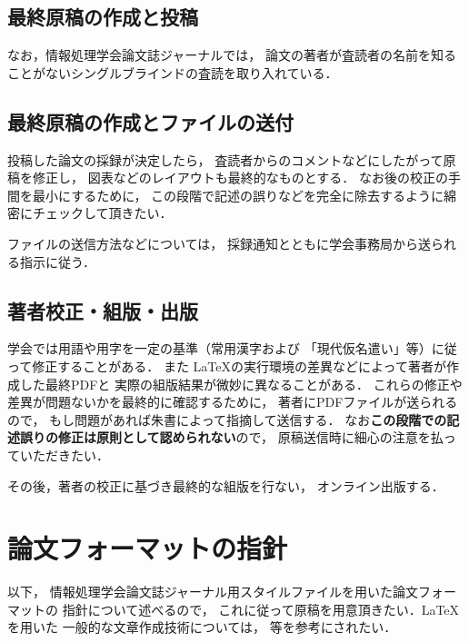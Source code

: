 \documentclass[submit]{ipsj}
\begin{document}
\subsection{最終原稿の作成と投稿}


なお，情報処理学会論文誌ジャーナルでは，
論文の著者が査読者の名前を知ることがないシングルブラインドの査読を取り入れている．




\subsection{最終原稿の作成とファイルの送付}

投稿した論文の採録が決定したら，
査読者からのコメントなどにしたがって原稿を修正し，
図表などのレイアウトも最終的なものとする．
なお後の校正の手間を最小にするために，
この段階で記述の誤りなどを完全に除去するように綿密にチェックして頂きたい．



ファイルの送信方法などについては，
採録通知とともに学会事務局から送られる指示に従う．




\subsection{著者校正・組版・出版}


学会では用語や用字を一定の基準（常用漢字および
「現代仮名遣い」等）に従って修正することがある．
また \LaTeX の実行環境の差異などによって著者が作成した最終PDFと
実際の組版結果が微妙に異なることがある．
これらの修正や差異が問題ないかを最終的に確認するために，
著者にPDFファイルが送られるので，
もし問題があれば朱書によって指摘して送信する．
なお{\bf この段階での記述誤りの修正は原則として認められない}ので，
原稿送信時に細心の注意を払っていただきたい．


その後，著者の校正に基づき最終的な組版を行ない，
オンライン出版する．




\section{論文フォーマットの指針}
\label{sec:format}

以下，
情報処理学会論文誌ジャーナル用スタイルファイルを用いた論文フォーマットの
指針について述べるので，
これに従って原稿を用意頂きたい．\LaTeX を用いた
一般的な文章作成技術については，\cite{okumura} 等を参考にされたい．








\end{document}

